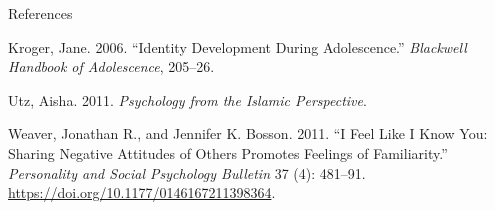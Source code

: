 \documentclass[
  ignorenonframetext,
  aspectratio=169,
]{beamer}
\newlength{\cslhangindent}
\newenvironment{CSLReferences}[2] %
 {\begin{list}{}{%
  \setlength{\itemindent}{0pt}
  \setlength{\leftmargin}{0pt}
  \setlength{\parsep}{0pt}
  \ifodd #1
   \setlength{\leftmargin}{\cslhangindent}
   \setlength{\itemindent}{-1\cslhangindent}
  \fi
  \setlength{\itemsep}{#2\baselineskip}}}
 {\end{list}}
\begin{document}
\begin{frame}{References}
\begin{CSLReferences}{1}{0}
Kroger, Jane. 2006. {``Identity Development During Adolescence.''}
\emph{Blackwell Handbook of Adolescence}, 205--26.

Utz, Aisha. 2011. \emph{Psychology from the Islamic Perspective}.

Weaver, Jonathan R., and Jennifer K. Bosson. 2011. {``I Feel Like I Know
You: Sharing Negative Attitudes of Others Promotes Feelings of
Familiarity.''} \emph{Personality and Social Psychology Bulletin} 37
(4): 481--91. \url{https://doi.org/10.1177/0146167211398364}.

\end{CSLReferences}
\end{frame}
\end{document}
